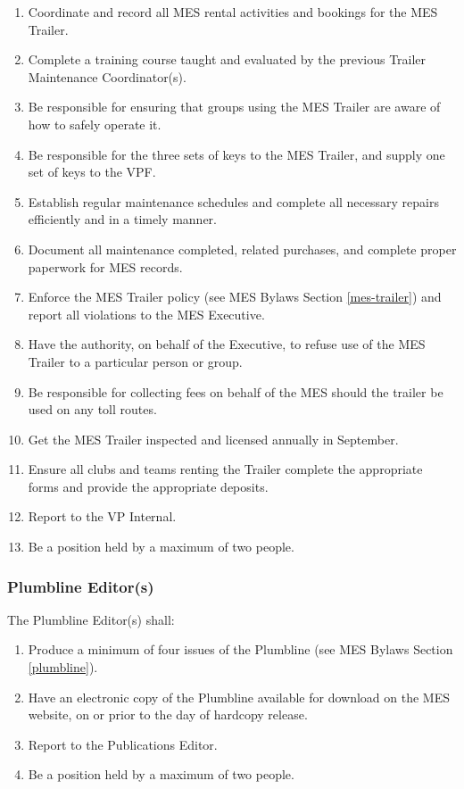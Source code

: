 \begin{enumerate}
 \item
  Coordinate and record all MES rental activities and bookings for the MES Trailer.
 \item
  Complete a training course taught and evaluated by the previous Trailer Maintenance Coordinator(s).
 \item
  Be responsible for ensuring that groups using the MES Trailer are aware of how to safely operate it.
 \item
  Be responsible for the three sets of keys to the MES Trailer, and supply one set of keys to the VPF.
 \item
  Establish regular maintenance schedules and complete all necessary repairs efficiently and in a timely manner.
 \item
  Document all maintenance completed, related purchases, and complete proper paperwork for MES records.
 \item
  Enforce the MES Trailer policy (see MES Bylaws Section \ref{mes-trailer}) and report all violations to the MES Executive.
 \item
  Have the authority, on behalf of the Executive, to refuse use of the MES Trailer to a particular person or group.
 \item
  Be responsible for collecting fees on behalf of the MES should the trailer be used on any toll routes.
 \item
  Get the MES Trailer inspected and licensed annually in September.
 \item
  Ensure all clubs and teams renting the Trailer complete the appropriate forms and provide the appropriate deposits.
 \item
  Report to the VP Internal.
 \item
  Be a position held by a maximum of two people.

\end{enumerate}

\subsubsection{Plumbline Editor(s)}
\label{plumbline-editors}
The Plumbline Editor(s) shall:

\begin{enumerate}
 \item
  Produce a minimum of four issues of the Plumbline (see MES Bylaws Section \ref{plumbline}).
 \item
  Have an electronic copy of the Plumbline available for download on the MES website, on or prior to the day of hardcopy release.
 \item
  Report to the Publications Editor.
 \item
  Be a position held by a maximum of two people.

\end{enumerate}

